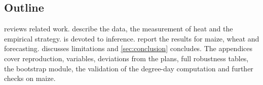 \subsection*{Outline}

 reviews related work.  describe the data, the measurement of heat and the empirical strategy.  is devoted to inference.  report the results for maize, wheat and forecasting.  discusses limitations and \cref{sec:conclusion} concludes. The appendices cover reproduction, variables, deviations from the plans, full robustness tables, the bootstrap module, the validation of the degree-day computation and further checks on maize.
